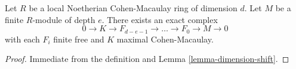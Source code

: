 \begin{lemma}
\label{lemma-mcm-resolution}
Let $R$ be a local Noetherian Cohen-Macaulay ring of dimension $d$.
Let $M$ be a finite $R$-module of depth $e$.
There exists an exact complex
$$
0 \to K \to F_{d-e-1} \to \ldots \to F_0 \to M \to 0
$$
with each $F_i$ finite free and $K$ maximal Cohen-Macaulay.
\end{lemma}

\begin{proof}
Immediate from the definition and Lemma \ref{lemma-dimension-shift}.
\end{proof}

